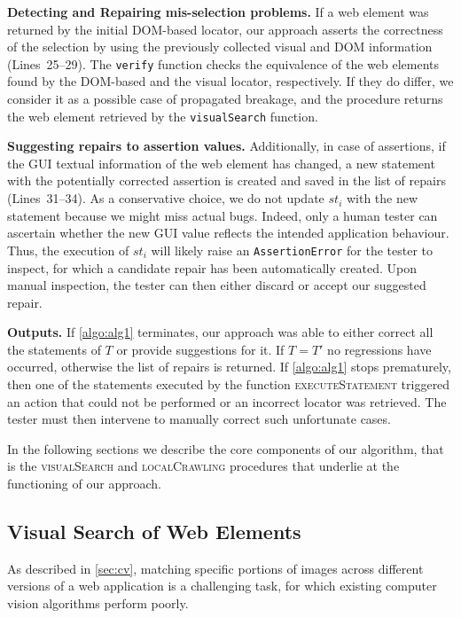 \noindent
\textbf{Detecting and Repairing mis-selection problems.}
If a web element was returned by the initial DOM-based locator, our approach asserts the correctness of the selection by using the previously collected visual and DOM information (Lines~25--29). 
The \texttt{verify} function checks the equivalence of the web elements found by the DOM-based and the visual locator, respectively. If they do differ, we consider it as a possible case of propagated breakage, and the procedure returns the web element retrieved by the \texttt{visualSearch} function.

\noindent
\textbf{Suggesting repairs to assertion values.}
Additionally, in case of assertions, if the GUI textual information of the web element has changed, a new statement with the potentially corrected assertion is created and saved in the list of repairs (Lines~31--34). As a conservative choice, we do not update $st_i$ with the new statement because we might miss actual bugs.
Indeed, only a human tester can ascertain whether the new GUI value reflects the intended application behaviour. Thus, the execution of $st_i$ will likely raise an \texttt{AssertionError} for the tester to inspect, for which a candidate repair has been automatically created. Upon manual inspection, the tester can then either discard or accept our suggested repair.

\noindent
\textbf{Outputs.}
If \autoref{algo:alg1} terminates, our approach was able to either correct all the statements of $T$ or provide suggestions for it. 
 If $T = T'$ no regressions have occurred, otherwise the list of repairs is returned.
If \autoref{algo:alg1} stops prematurely, then one of the statements executed by the function \textsc{executeStatement} triggered an action that could not be performed or an incorrect locator was retrieved. The tester must then intervene to manually correct such unfortunate cases.

In the following sections we describe the core components of our algorithm, that is the \textsc{visualSearch} and \textsc{localCrawling} procedures that underlie at the functioning of our approach.

\subsection{Visual Search of Web Elements}\label{sec:vis}

As described in \autoref{sec:cv}, matching specific portions of images across different versions of a web application is a challenging task, for which existing computer vision algorithms perform poorly. 

